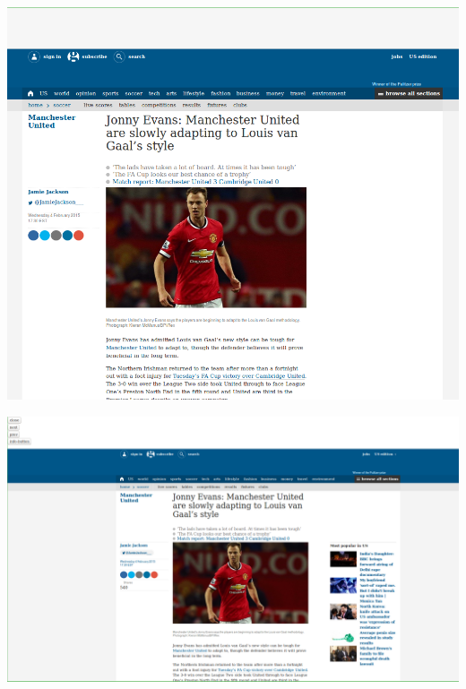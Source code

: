 \begin{minipage}{\linewidth}
	\includegraphics[scale=0.55]{figures/playback/webrecorder_89_wail.PNG}
	\label{webrecorder_89_wail}
\end{minipage}
\newpage
\begin{minipage}{\linewidth}
	\includegraphics[scale=0.55]{figures/playback/webrecorder_89_warcreate.PNG}
	\label{webrecorder_89_warcreate}
\end{minipage}
\newpage
